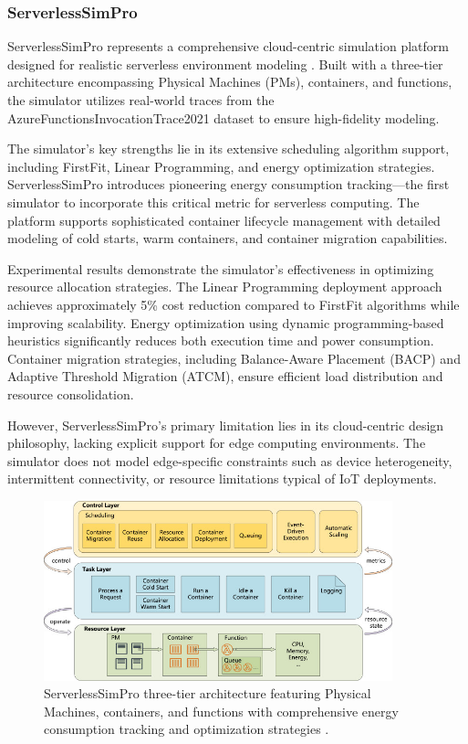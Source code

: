 \subsubsection{ServerlessSimPro}

ServerlessSimPro represents a comprehensive cloud-centric simulation platform designed for realistic serverless environment modeling \cite{das2022serverlesssimpro}. Built with a three-tier architecture encompassing Physical Machines (PMs), containers, and functions, the simulator utilizes real-world traces from the AzureFunctionsInvocationTrace2021 dataset to ensure high-fidelity modeling.

The simulator's key strengths lie in its extensive scheduling algorithm support, including FirstFit, Linear Programming, and energy optimization strategies. ServerlessSimPro introduces pioneering energy consumption tracking—the first simulator to incorporate this critical metric for serverless computing. The platform supports sophisticated container lifecycle management with detailed modeling of cold starts, warm containers, and container migration capabilities.

Experimental results demonstrate the simulator's effectiveness in optimizing resource allocation strategies. The Linear Programming deployment approach achieves approximately 5\% cost reduction compared to FirstFit algorithms while improving scalability. Energy optimization using dynamic programming-based heuristics significantly reduces both execution time and power consumption. Container migration strategies, including Balance-Aware Placement (BACP) and Adaptive Threshold Migration (ATCM), ensure efficient load distribution and resource consolidation.

However, ServerlessSimPro's primary limitation lies in its cloud-centric design philosophy, lacking explicit support for edge computing environments. The simulator does not model edge-specific constraints such as device heterogeneity, intermittent connectivity, or resource limitations typical of IoT deployments.


\begin{figure}[htbp]
\centering
\includegraphics[width=0.9\textwidth]{assets/serverlesssimproArch.jpg}
\caption{ServerlessSimPro three-tier architecture featuring Physical Machines, containers, and functions with comprehensive energy consumption tracking and optimization strategies \cite{das2022serverlesssimpro}.}
\label{fig:serverlesssimpro-architecture}
\end{figure}



